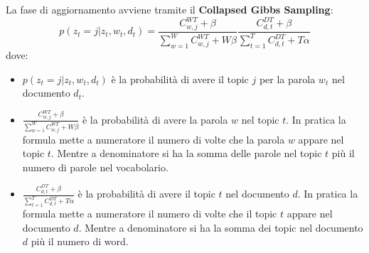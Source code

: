 La fase di aggiornamento avviene tramite il \textbf{Collapsed Gibbs Sampling}:
\begin{equation}
      p(z_t = j | z_t, w_t,d_t) = \frac{C_{w, j}^{WT} + \beta}{\sum_{w = 1}^{W} C_{w, j}^{WT} + W\beta}
      \frac{C_{d, t}^{DT} + \beta}{\sum_{t = 1}^{T} C_{d, t}^{DT} + T\alpha}
\end{equation}
dove:
\begin{itemize}
      \item $p(z_t = j | z_t, w_t,d_t)$ è la probabilità di avere il topic $j$
            per la parola $w_t$ nel documento $d_t$.
      \item $\frac{C_{w, j}^{WT} + \beta}{\sum_{w = 1}^{W} C_{w, j}^{WT} + W\beta}$
            è la probabilità di avere la parola $w$ nel topic $t$. In pratica la
            formula mette a numeratore il numero di volte che la parola $w$ appare
            nel topic $t$. Mentre a denominatore si ha la somma delle parole nel
            topic $t$ più il numero di parole nel vocabolario.
      \item $\frac{C_{d, t}^{DT} + \beta}{\sum_{t = 1}^{T} C_{d, t}^{DT} + T\alpha}$
            è la probabilità di avere il topic $t$ nel documento $d$. In pratica
            la formula mette a numeratore il numero di volte che il topic $t$ appare
            nel documento $d$. Mentre a denominatore si ha la somma dei topic
            nel documento $d$ più il numero di word.
\end{itemize}
